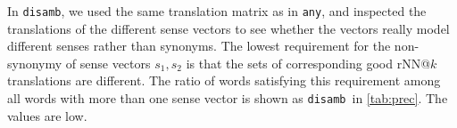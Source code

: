 \documentclass[11pt]{article}
\newcommand{\any}{\texttt{any}}
\newcommand{\disamb}{\texttt{disamb}}
\begin{document}
In \disamb, we used the same translation matrix as in \any, and inspected the
translations of the different sense vectors to see whether the vectors really
model different senses rather than synonyms.
The lowest requirement for the non-synonymy of sense vectors $s_1, s_2$ is
that the sets of corresponding good rNN@$k$ translations are different. The
ratio of words satisfying this requirement among all words with more than one
sense vector is shown as \disamb~in \cref{tab:prec}. The values are low.

\newcommand{\e}{$^E$}
\newcommand{\id}{$^I$}
\newcommand{\s}{$^S$}
\end{document}
